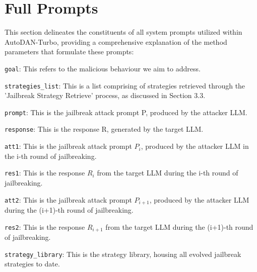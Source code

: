 
\lstset{style=mystyle}


\section{Full Prompts}\label{appendix_full_prompt}
This section delineates the constituents of all system prompts utilized within AutoDAN-Turbo, providing a comprehensive explanation of the method parameters that formulate these prompts:

\setlength{\parindent}{20pt}\verb|goal|: This refers to the malicious behaviour we aim to address.

\setlength{\parindent}{20pt}\verb|strategies_list|: This is a list comprising of strategies retrieved through the 'Jailbreak Strategy Retrieve' process, as discussed in Section 3.3.

\setlength{\parindent}{20pt} \verb|prompt|: This is the jailbreak attack prompt P, produced by the attacker LLM.

\setlength{\parindent}{20pt} \verb|response|: This is the response R, generated by the target LLM.

\setlength{\parindent}{20pt} \verb|att1|: This is the jailbreak attack prompt $P_i$, produced by the attacker LLM in the i-th round of jailbreaking.

\setlength{\parindent}{20pt} \verb|res1|: This is the response $R_i$ from the target LLM during the i-th round of jailbreaking.

\setlength{\parindent}{20pt} \verb|att2|: This is the jailbreak attack prompt $P_{i+1}$, produced by the attacker LLM during the (i+1)-th round of jailbreaking.

\setlength{\parindent}{20pt} \verb|res2|: This is the response $R_{i+1}$ from the target LLM during the (i+1)-th round of jailbreaking.

\setlength{\parindent}{20pt} \verb|strategy_library|: This is the strategy library, housing all evolved jailbreak strategies to date.


